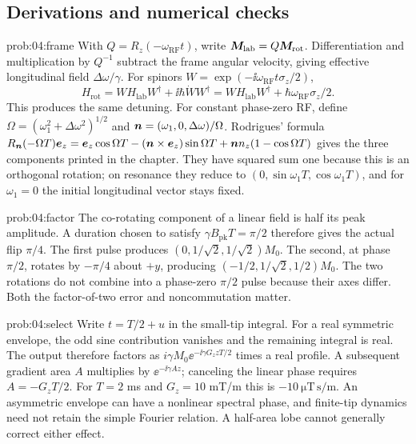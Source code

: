\subsection{Derivations and numerical checks}
\begin{solution}{prob:04:frame}
With \(Q=R_z(-\omega_{\mathrm{RF}}t)\), write
\(\bm{M}_{\mathrm{lab}}=Q\bm{M}_{\mathrm{rot}}\).
Differentiation and multiplication by \(Q^{-1}\) subtract the frame angular velocity, giving effective longitudinal field
\(\Delta\omega/\gamma\).
For spinors \(W=\exp(-\ii\omega_{\mathrm{RF}}t\sigma_z/2)\),
\[
 H_{\mathrm{rot}}=WH_{\mathrm{lab}}W^\dagger+
 \ii\hbar\dot W W^\dagger
 =WH_{\mathrm{lab}}W^\dagger+\hbar\omega_{\mathrm{RF}}\sigma_z/2.
\]
This produces the same detuning. For constant phase-zero RF, define
\(\Omega=(\omega_1^2+\Delta\omega^2)^{1/2}\) and
\(\bm{n}=(\omega_1,0,\Delta\omega)/\Omega\).
Rodrigues' formula
\(R_{\bm{n}}(-\Omega T)\bm{e}_z=
\bm{e}_z\cos\Omega T-(\bm{n}\times\bm{e}_z)\sin\Omega T+
\bm{n} n_z(1-\cos\Omega T)\)
gives the three components printed in the chapter.
They have squared sum one because this is an orthogonal rotation; on resonance they reduce to \((0,\sin\omega_1T,\cos\omega_1T)\), and for \(\omega_1=0\) the initial longitudinal vector stays fixed.
\end{solution}
\begin{solution}{prob:04:factor}
The co-rotating component of a linear field is half its peak amplitude.
A duration chosen to satisfy \(\gamma B_{\mathrm{pk}}T=\pi/2\) therefore gives the actual flip \(\pi/4\).
The first pulse produces \((0,1/\sqrt2,1/\sqrt2)M_0\).
The second, at phase \(\pi/2\), rotates by \(-\pi/4\) about \(+y\), producing
\((-1/2,1/\sqrt2,1/2)M_0\).
The two rotations do not combine into a phase-zero \(\pi/2\) pulse because their axes differ. Both the factor-of-two error and noncommutation matter.
\end{solution}
\begin{solution}{prob:04:select}
Write \(t=T/2+u\) in the small-tip integral.
For a real symmetric envelope, the odd sine contribution vanishes and the remaining integral is real. The output therefore factors as
\(i\gamma M_0\ee^{-\ii\gamma G_z zT/2}\) times a real profile.
A subsequent gradient area \(A\) multiplies by \(\ee^{-\ii\gamma Az}\); canceling the linear phase requires \(A=-G_zT/2\).
For \(T=2\) ms and \(G_z=10\) mT/m this is
\(-10\ \mathrm{\mu T\,s/m}\).
An asymmetric envelope can have a nonlinear spectral phase, and finite-tip dynamics need not retain the simple Fourier relation. A half-area lobe cannot generally correct either effect.
\end{solution}
